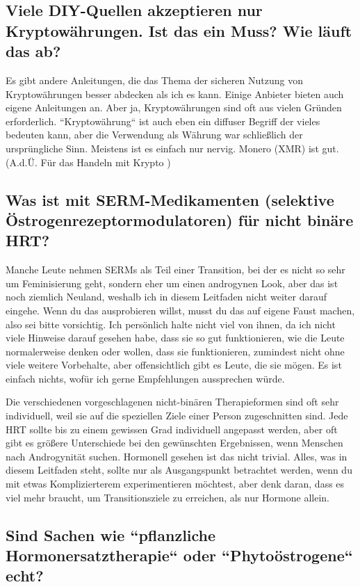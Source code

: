 \documentclass{article}
\begin{document}
\subsection{Viele DIY-Quellen akzeptieren nur Kryptowährungen. Ist das ein Muss? Wie läuft das ab?}

Es gibt andere Anleitungen, die das Thema der sicheren Nutzung von Kryptowährungen besser abdecken als ich es kann. Einige Anbieter bieten auch eigene Anleitungen an. Aber ja, Kryptowährungen sind oft aus vielen Gründen erforderlich. “Kryptowährung“ ist auch eben ein diffuser Begriff der vieles bedeuten kann, aber die Verwendung als Währung war schließlich der ursprüngliche Sinn. Meistens ist es einfach nur nervig. Monero (XMR) ist gut. (A.d.Ü. Für das Handeln mit Krypto )

\subsection{Was ist mit SERM-Medikamenten (selektive Östrogenrezeptormodulatoren) für nicht binäre HRT?}

Manche Leute nehmen SERMs als Teil einer Transition, bei der es nicht so sehr um Feminisierung geht, sondern eher um einen androgynen Look, aber das ist noch ziemlich Neuland, weshalb ich in diesem Leitfaden nicht weiter darauf eingehe. Wenn du das ausprobieren willst, musst du das auf eigene Faust machen, also sei bitte vorsichtig. Ich persönlich halte nicht viel von ihnen, da ich nicht viele Hinweise darauf gesehen habe, dass sie so gut funktionieren, wie die Leute normalerweise denken oder wollen, dass sie funktionieren, zumindest nicht ohne viele weitere Vorbehalte, aber offensichtlich gibt es Leute, die sie mögen. Es ist einfach nichts, wofür ich gerne Empfehlungen aussprechen würde.

Die verschiedenen vorgeschlagenen nicht-binären Therapieformen sind oft sehr individuell, weil sie auf die speziellen Ziele einer Person zugeschnitten sind. Jede HRT sollte bis zu einem gewissen Grad individuell angepasst werden, aber oft gibt es größere Unterschiede bei den gewünschten Ergebnissen, wenn Menschen nach Androgynität suchen. Hormonell gesehen ist das nicht trivial. Alles, was in diesem Leitfaden steht, sollte nur als Ausgangspunkt betrachtet werden, wenn du mit etwas Komplizierterem experimentieren möchtest, aber denk daran, dass es viel mehr braucht, um Transitionsziele zu erreichen, als nur Hormone allein.

\subsection{Sind Sachen wie “pflanzliche Hormonersatztherapie“ oder “Phytoöstrogene“ echt?}
\end{document}
